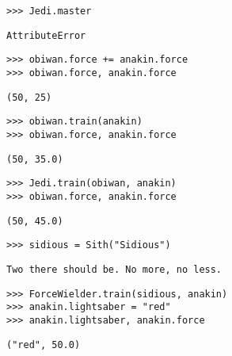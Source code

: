 \begin{lstlisting}
>>> Jedi.master
\end{lstlisting}
\begin{solution}[.2in]
\begin{lstlisting}
AttributeError
\end{lstlisting}
\end{solution}

\begin{lstlisting}
>>> obiwan.force += anakin.force
>>> obiwan.force, anakin.force
\end{lstlisting}
\begin{solution}[.2in]
\begin{lstlisting}
(50, 25)
\end{lstlisting}
\end{solution}

\begin{lstlisting}
>>> obiwan.train(anakin)
>>> obiwan.force, anakin.force
\end{lstlisting}
\begin{solution}[.2in]
\begin{lstlisting}
(50, 35.0)
\end{lstlisting}
\end{solution}

\begin{lstlisting}
>>> Jedi.train(obiwan, anakin)
>>> obiwan.force, anakin.force
\end{lstlisting}
\begin{solution}[.2in]
\begin{lstlisting}
(50, 45.0)
\end{lstlisting}
\end{solution}

\begin{lstlisting}
>>> sidious = Sith("Sidious")
\end{lstlisting}
\begin{solution}[.2in]
\begin{lstlisting}
Two there should be. No more, no less.
\end{lstlisting}
\end{solution}

\begin{lstlisting}
>>> ForceWielder.train(sidious, anakin)
>>> anakin.lightsaber = "red"
>>> anakin.lightsaber, anakin.force
\end{lstlisting}
\begin{solution}[.2in]
\begin{lstlisting}
("red", 50.0)
\end{lstlisting}
\end{solution}

